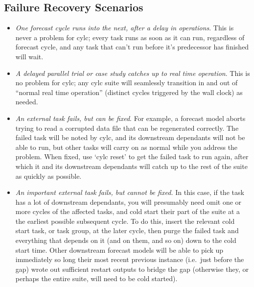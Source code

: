 \documentclass[11pt,a4paper]{article}
\begin{document}
\subsection{Failure Recovery Scenarios}
\label{FailureRecoveryScenarios}

\begin{itemize}
    \item {\em One forecast cycle runs into the next, after a delay in
        operations}. This is never a problem for cylc; every task runs
        as soon as it can run, regardless of forecast cycle, and any
        task that can't run before it's predecessor has finished will
        wait.

    \item {\em A delayed parallel trial or case study catches up to real
        time operation}. This is no problem for cylc; any cylc suite
        will seamlessly transition in and out of ``normal real time
        operation'' (distinct cycles triggered by the wall clock) as needed.

    \item {\em An external task fails, but can be fixed}. For example, a
        forecast model aborts trying to read a corrupted data file that
        can be regenerated correctly. The failed task will be noted by
        cylc, and its downstream dependants will not be able to run,
        but other tasks will carry on as normal while you address the
        problem. When fixed, use `cylc reset' to get the failed task to
        run again, after which it and its downstream dependants will
        catch up to the rest of the suite as quickly as possible.

    \item {\em An important external task fails, but cannot be fixed.}
        In this case, if the task has a lot of downstream dependants,
        you will presumably need omit one or more cycles of the affected
        tasks, and cold start their part of the suite at a the earliest
        possible subsequent cycle.  To do this, insert the relevant cold
        start task, or task group, at the later cycle, then purge the
        failed task and everything that depends on it (and on them, and
        so on) down to the cold start time.  Other downstream forecast
        models will be able to pick up immediately so long their most
        recent previous instance (i.e.\ just before the gap) wrote out
        sufficient restart outputs to bridge the gap (otherwise they,
        or perhaps the entire suite, will need to be cold started). 


\end{itemize}
\end{document}
